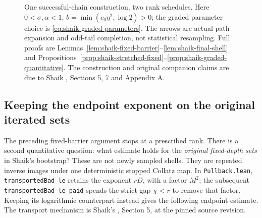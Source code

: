 \documentclass[11pt]{article}
\theoremstyle{remark}\newtheorem{remark}[proposition]{Remark}
\begin{document}
\begin{figure}[ht]
\centering
{}
\caption{One successful-chain construction, two rank schedules.
Here \(0<\sigma,\alpha<1\), \(b=\min(c_0\eta^2,\log2)>0\);
the graded parameter choice is \eqref{eq:shaik-graded-parameters}.
The arrows are actual path expansion and odd-tail completion, not
statistical resampling. Full proofs are
Lemmas~\ref{lem:shaik-fixed-barrier}--\ref{lem:shaik-final-shell} and
Propositions~\ref{prop:shaik-stretched-fixed}--\ref{prop:shaik-graded-quantitative}.
The construction and original companion claims are due to Shaik
\cite{Shaik2026v324}, Sections 5, 7 and Appendix A.}
\end{figure}

\subsection{Keeping the endpoint exponent on the original iterated sets}

The preceding fixed-barrier argument stops at a prescribed rank.
There is a second quantitative question: what estimate holds for the
\emph{original fixed-depth sets} in Shaik's bootstrap?
These are not newly sampled shells. They are repeated inverse images
under one deterministic stopped Collatz map.
In \texttt{Pullback.lean}, \texttt{transportedBad\_le} retains the
exponent \(rD\), with a factor \(M^2\); the subsequent
\texttt{transportedBad\_le\_paid} spends the strict gap \(\chi<r\)
to remove that factor. Keeping its logarithmic counterpart instead
gives the following endpoint estimate. The transport mechanism is
Shaik's \cite{Shaik2026v324}, Section 5, at the pinned source revision.
\end{document}
